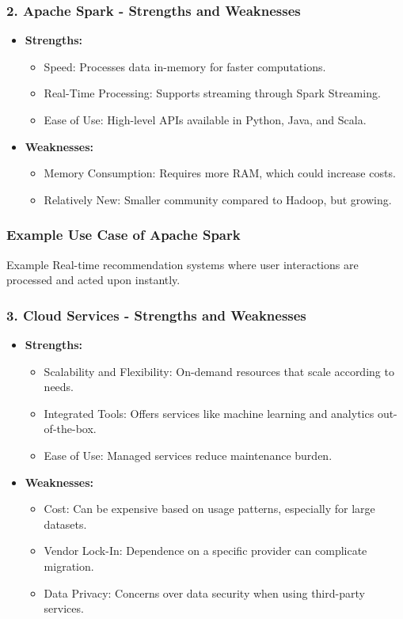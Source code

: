 \documentclass[aspectratio=169]{beamer}
\begin{document}
\begin{frame}[fragile]
    \frametitle{2. Apache Spark - Strengths and Weaknesses}
    \begin{itemize}
        \item \textbf{Strengths:}
        \begin{itemize}
            \item Speed: Processes data in-memory for faster computations.
            \item Real-Time Processing: Supports streaming through Spark Streaming.
            \item Ease of Use: High-level APIs available in Python, Java, and Scala.
        \end{itemize}
        \item \textbf{Weaknesses:}
        \begin{itemize}
            \item Memory Consumption: Requires more RAM, which could increase costs.
            \item Relatively New: Smaller community compared to Hadoop, but growing.
        \end{itemize}
    \end{itemize}
\end{frame}

\begin{frame}[fragile]
    \frametitle{Example Use Case of Apache Spark}
    \begin{block}{Example}
        Real-time recommendation systems where user interactions are processed and acted upon instantly.
    \end{block}
\end{frame}

\begin{frame}[fragile]
    \frametitle{3. Cloud Services - Strengths and Weaknesses}
    \begin{itemize}
        \item \textbf{Strengths:}
        \begin{itemize}
            \item Scalability and Flexibility: On-demand resources that scale according to needs.
            \item Integrated Tools: Offers services like machine learning and analytics out-of-the-box.
            \item Ease of Use: Managed services reduce maintenance burden.
        \end{itemize}
        \item \textbf{Weaknesses:}
        \begin{itemize}
            \item Cost: Can be expensive based on usage patterns, especially for large datasets.
            \item Vendor Lock-In: Dependence on a specific provider can complicate migration.
            \item Data Privacy: Concerns over data security when using third-party services.
        \end{itemize}
    \end{itemize}
\end{frame}
\end{document}
